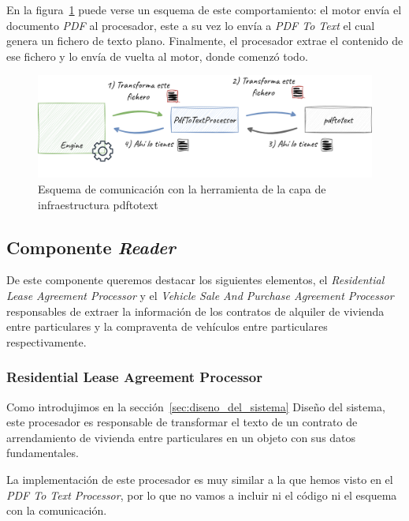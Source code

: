 En la figura~\ref{fig:chapter_4.4.generator_component_pdf_to_text_processor} puede verse un esquema de este
comportamiento: el motor envía el documento \textit{PDF} al procesador, este a su vez lo envía a \textit{PDF To Text}
el cual genera un fichero de texto plano.
Finalmente, el procesador extrae el contenido de ese fichero y lo envía de vuelta al motor, donde comenzó todo.

\begin{figure}[ht]
    \begin{center}
        \includegraphics[width=\textwidth]{./chapter/4/images/chapter_4.4.generator_component_pdf_to_text_processor}
        \caption{Esquema de comunicación con la herramienta de la capa de infraestructura pdftotext}
        \label{fig:chapter_4.4.generator_component_pdf_to_text_processor}
    \end{center}
\end{figure}

\subsection*{Componente \textit{Reader}}

De este componente queremos destacar los siguientes elementos, el \textit{Residential Lease Agreement Processor} y el
\textit{Vehicle Sale And Purchase Agreement Processor} responsables de extraer la información de los contratos de
alquiler de vivienda entre particulares y la compraventa de vehículos entre particulares respectivamente.

\subsubsection*{Residential Lease Agreement Processor}

Como introdujimos en la sección~\ref{sec:diseno_del_sistema} Diseño del sistema, este procesador es responsable de
transformar el texto de un contrato de arrendamiento de vivienda entre particulares en un objeto con sus datos
fundamentales.

La implementación de este procesador es muy similar a la que hemos visto en el \textit{PDF To Text Processor}, por lo
que no vamos a incluir ni el código ni el esquema con la comunicación.


